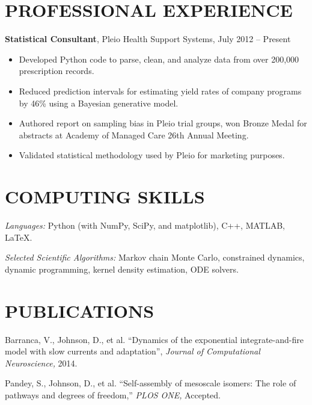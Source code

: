 \documentclass[margin]{res}
\begin{document}
\begin{resume}
\section{PROFESSIONAL EXPERIENCE} {\bf Statistical Consultant}, Pleio Health Support Systems, July 2012 -- Present 
				\begin{itemize}\itemsep -2pt
                                  \item Developed Python code to parse, clean, and analyze data from over 200,000 prescription records.
                                  \item Reduced prediction intervals for estimating yield rates of company programs by 46\% using a Bayesian generative model.
                                  \item Authored report on sampling bias in Pleio trial groups, won Bronze Medal for abstracts at Academy of Managed Care 26th Annual Meeting.
                                  \item Validated statistical methodology used by Pleio for marketing purposes. 
				\end{itemize}
                                			

\section{COMPUTING SKILLS}	{\sl Languages:} Python (with NumPy, SciPy, and matplotlib), C++, MATLAB, \LaTeX.

				{\sl Selected Scientific Algorithms:} Markov chain Monte Carlo, constrained dynamics, dynamic programming, kernel density estimation, ODE solvers.

 
\section{PUBLICATIONS} Barranca, V., Johnson, D., et al. ``Dynamics of the exponential integrate-and-fire model with slow currents and adaptation'', {\sl Journal of Computational Neuroscience,} 2014. 

			Pandey, S., Johnson, D., et al. ``Self-assembly of mesoscale isomers: The role of pathways and degrees of freedom,'' {\sl PLOS ONE,} Accepted.



\end{resume}
\end{document}
